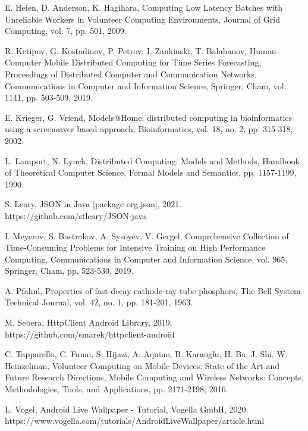 \documentclass[a4paper,conference]{IEEEtran}
\begin{document}
\begin{thebibliography}{00}
 E. Heien, D. Anderson, K. Hagihara, Computing Low Latency Batches with Unreliable Workers in Volunteer Computing Environments, Journal of Grid Computing, vol. 7, pp. 501, 2009.

 R. Ketipov, G. Kostadinov, P. Petrov, I. Zankinski, T. Balabanov, Human-Computer Mobile Distributed Computing for Time Series Forecasting, Proceedings of Distributed Computer and Communication Networks, Communications in Computer and Information Science, Springer, Cham, vol. 1141, pp. 503-509, 2019.

 E. Krieger, G. Vriend, Models@Home: distributed computing in bioinformatics using a screensaver based approach, Bioinformatics, vol. 18, no. 2, pp. 315-318, 2002.

 L. Lamport, N. Lynch, Distributed Computing: Models and Methods, Handbook of Theoretical Computer Science, Formal Models and Semantics, pp. 1157-1199, 1990.

 S. Leary, JSON in Java [package org.json], 2021. https://github.com/stleary/JSON-java

 I. Meyerov, S. Bastrakov, A. Sysoyev, V. Gergel, Comprehensive Collection of Time-Consuming Problems for Intensive Training on High Performance Computing, Communications in Computer and Information Science, vol. 965, Springer, Cham, pp. 523-530, 2019.

 A. Pfahnl, Properties of fast-decay cathode-ray tube phosphors, The Bell System Technical Journal, vol. 42, no. 1, pp. 181-201, 1963.

 M. Sebera, HttpClient Android Library, 2019. https://github.com/smarek/httpclient-android

 C. Tapparello, C. Funai, S. Hijazi, A. Aquino, B. Karaoglu, H. Ba, J. Shi, W. Heinzelman, Volunteer Computing on Mobile Devices: State of the Art and Future Research Directions, Mobile Computing and Wireless Networks: Concepts, Methodologies, Tools, and Applications, pp. 2171-2198, 2016.

 L. Vogel, Android Live Wallpaper - Tutorial, Vogella GmbH, 2020. https://www.vogella.com/tutorials/AndroidLiveWallpaper/article.html

\end{thebibliography}
\end{document}
